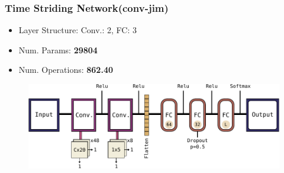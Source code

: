 \begin{frame}
  \frametitle{Time Striding Network(conv-jim)}
  \begin{itemize}
    \item Layer Structure: Conv.: 2, FC: 3
    \item Num. Params: \textbf{\num{29804}}
    \item Num. Operations: \textbf{\SI{862.40}{\kilo\ops}}
  \end{itemize}
  \begin{figure} \includegraphics[height=0.35\textheight]{../4_nn/figs/nn_arch_cnn_jim.pdf} \end{figure}
\end{frame}


